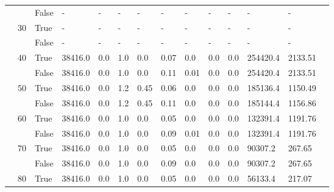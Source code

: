 \documentclass{article}
\begin{document}
\begin{landscape}
\begin{small}
\begin{longtable}[c]{@{}lll|ll|ll|ll|ll|lll@{}}
   &    & False & -               & -              & -             & -             & -             & -             & -             & -             & -             & -           &  \\
   & 30 & True  & -               & -              & -             & -             & -             & -             & -             & -             & -             & -           &  \\
   &    & False & -               & -              & -             & -             & -             & -             & -             & -             & -             & -           &  \\
   & 40 & True  & 38416.0         & 0.0            & 1.0           & 0.0           & 0.07          & 0.0           & 0.0           & 0.0           & 254420.4      & 2133.51     &  \\
   &    & False & 38416.0         & 0.0            & 1.0           & 0.0           & 0.11          & 0.01          & 0.0           & 0.0           & 254420.4      & 2133.51     &  \\
   & 50 & True  & 38416.0         & 0.0            & 1.2           & 0.45          & 0.06          & 0.0           & 0.0           & 0.0           & 185136.4      & 1150.49     &  \\
   &    & False & 38416.0         & 0.0            & 1.2           & 0.45          & 0.11          & 0.0           & 0.0           & 0.0           & 185144.4      & 1156.86     &  \\
   & 60 & True  & 38416.0         & 0.0            & 1.0           & 0.0           & 0.05          & 0.0           & 0.0           & 0.0           & 132391.4      & 1191.76     &  \\
   &    & False & 38416.0         & 0.0            & 1.0           & 0.0           & 0.09          & 0.01          & 0.0           & 0.0           & 132391.4      & 1191.76     &  \\
   & 70 & True  & 38416.0         & 0.0            & 1.0           & 0.0           & 0.05          & 0.0           & 0.0           & 0.0           & 90307.2       & 267.65      &  \\
   &    & False & 38416.0         & 0.0            & 1.0           & 0.0           & 0.09          & 0.0           & 0.0           & 0.0           & 90307.2       & 267.65      &  \\
   & 80 & True  & 38416.0         & 0.0            & 1.0           & 0.0           & 0.05          & 0.0           & 0.0           & 0.0           & 56133.4       & 217.07      &  \\

\end{longtable}
\end{small}
\end{landscape}
\end{document}
